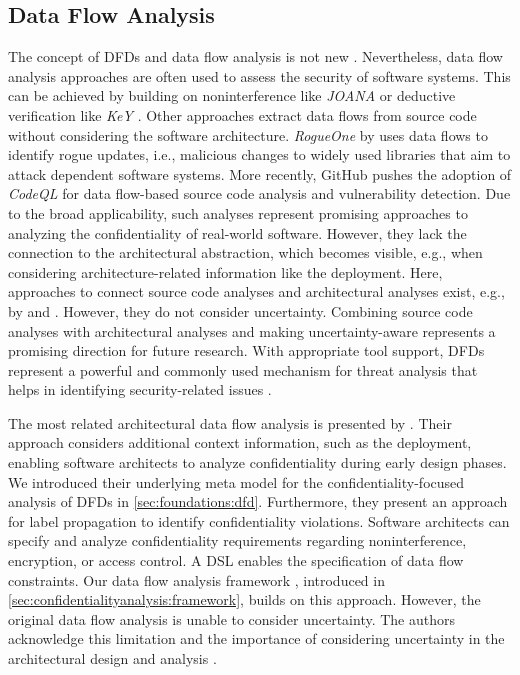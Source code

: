 \subsection{Data Flow Analysis}

The concept of \acp{DFD} and data flow analysis is not new \cite{demarco_structure_1979}.
Nevertheless, data flow analysis approaches are often used to assess the security of software systems.
This can be achieved by building on noninterference like \emph{JOANA} \cite{snelting_checking_2014} or deductive verification like \emph{KeY} \cite{ahrendt_deductive_2016}.
Other approaches extract data flows from source code without considering the software architecture.
\emph{RogueOne} by \textcite{sofaer_rogueone_2024} uses data flows to identify rogue updates, i.e., malicious changes to widely used libraries that aim to attack dependent software systems.
More recently, GitHub \cite{github_codeql_2021} pushes the adoption of \emph{CodeQL} \cite{de_moor_ql_2008} for data flow-based source code analysis and vulnerability detection.
Due to the broad applicability, such analyses represent promising approaches to analyzing the confidentiality of real-world software.
However, they lack the connection to the architectural abstraction, which becomes visible, e.g., when considering architecture-related information like the deployment.
Here, approaches to connect source code analyses and architectural analyses exist, e.g., by \textcite{kramer_model-driven_2017} and \textcite{reiche_modeling_2021}.
However, they do not consider uncertainty.
Combining source code analyses with architectural analyses and making uncertainty-aware represents a promising direction for future research.
With appropriate tool support, \acp{DFD} represent a powerful and commonly used mechanism for threat analysis \cite{bernsmed_adopting_2022} that helps in identifying security-related issues \cite{schneider_how_2024}.

The most related architectural data flow analysis is presented by \textcite{seifermann_detecting_2022}.
Their approach considers additional context information, such as the deployment, enabling software architects to analyze confidentiality during early design phases. 
We introduced their underlying meta model for the confidentiality-focused analysis of \acp{DFD} in \autoref{sec:foundations:dfd}.
Furthermore, they present an approach for label propagation to identify confidentiality violations.
Software architects can specify and analyze confidentiality requirements regarding noninterference, encryption, or access control.
A \acf{DSL} \cite{hahner_modeling_2021,hahner_domain-specific_2020} enables the specification of data flow constraints.
Our data flow analysis framework \cite{boltz_extensible_2024}, introduced in \autoref{sec:confidentialityanalysis:framework}, builds on this approach. 
However, the original data flow analysis is unable to consider uncertainty.
The authors acknowledge this limitation and the importance of considering uncertainty in the architectural design and analysis \cite{seifermann_architectural_2022}.

